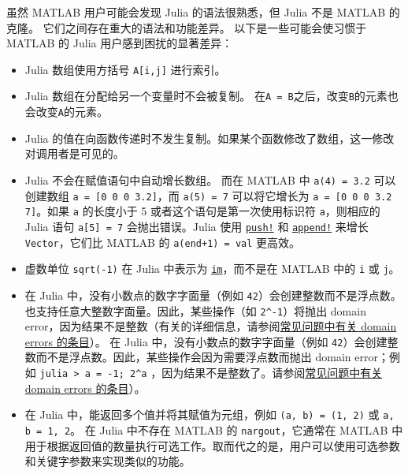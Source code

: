 虽然 MATLAB 用户可能会发现 Julia 的语法很熟悉，但 Julia 不是 MATLAB 的克隆。 它们之间存在重大的语法和功能差异。 以下是一些可能会使习惯于 MATLAB 的 Julia 用户感到困扰的显著差异：



\begin{itemize}
\item Julia 数组使用方括号 \texttt{A[i,j]} 进行索引。


\item Julia 数组在分配给另一个变量时不会被复制。 在\texttt{A = B}之后，改变\texttt{B}的元素也会改变\texttt{A}的元素。


\item Julia 的值在向函数传递时不发生复制。如果某个函数修改了数组，这一修改对调用者是可见的。


\item Julia 不会在赋值语句中自动增长数组。 而在 MATLAB 中 \texttt{a(4) = 3.2} 可以创建数组 \texttt{a = [0 0 0 3.2]}，而 \texttt{a(5) = 7} 可以将它增长为 \texttt{a = [0 0 0 3.2 7]}。如果 \texttt{a} 的长度小于 5 或者这个语句是第一次使用标识符 \texttt{a}，则相应的 Julia 语句 \texttt{a[5] = 7} 会抛出错误。Julia 使用 \hyperlink{18026893834387542681}{\texttt{push!}} 和 \hyperlink{2587432243763606566}{\texttt{append!}} 来增长 \texttt{Vector}，它们比 MATLAB 的 \texttt{a(end+1) = val} 更高效。


\item 虚数单位 \texttt{sqrt(-1)} 在 Julia 中表示为 \hyperlink{15097910740298861288}{\texttt{im}}，而不是在 MATLAB 中的 \texttt{i} 或 \texttt{j}。


\item 在 Julia 中，没有小数点的数字字面量（例如 \texttt{42}）会创建整数而不是浮点数。也支持任意大整数字面量。因此，某些操作（如 \texttt{2{\textasciicircum}-1}）将抛出 domain error，因为结果不是整数（有关的详细信息，请参阅\hyperlink{1677964623674152967}{常见问题中有关 domain errors 的条目}）。 在 Julia 中，没有小数点的数字字面量（例如 \texttt{42}）会创建整数而不是浮点数。因此，某些操作会因为需要浮点数而抛出 domain error；例如 \texttt{julia > a = -1; 2{\textasciicircum}a} ，因为结果不是整数了。请参阅\hyperlink{1677964623674152967}{常见问题中有关 domain errors 的条目}）。


\item 在 Julia 中，能返回多个值并将其赋值为元组，例如 \texttt{(a, b) = (1, 2)} 或 \texttt{a, b = 1, 2}。 在 Julia 中不存在 MATLAB 的 \texttt{nargout}，它通常在 MATLAB 中用于根据返回值的数量执行可选工作。取而代之的是，用户可以使用可选参数和关键字参数来实现类似的功能。



\end{itemize}
